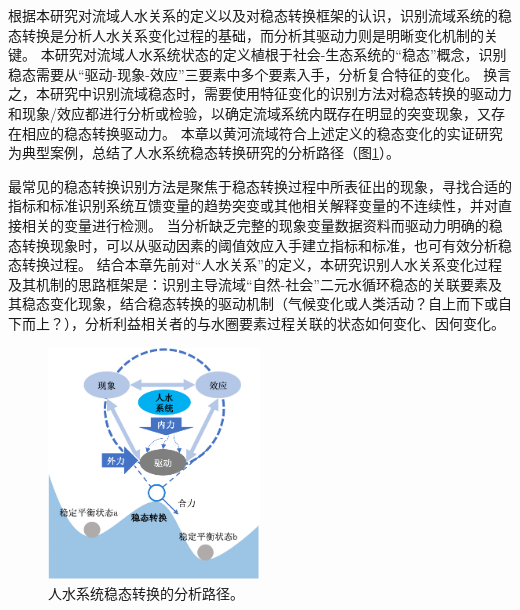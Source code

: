 根据本研究对流域人水关系的定义以及对稳态转换框架的认识，识别流域系统的稳态转换是分析人水关系变化过程的基础，而分析其驱动力则是明晰变化机制的关键。
本研究对流域人水系统状态的定义植根于社会-生态系统的“稳态”概念，识别稳态需要从“驱动-现象-效应”三要素中多个要素入手，分析复合特征的变化。
换言之，本研究中识别流域稳态时，需要使用特征变化的识别方法对稳态转换的驱动力和现象/效应都进行分析或检验，以确定流域系统内既存在明显的突变现象，又存在相应的稳态转换驱动力。
本章以黄河流域符合上述定义的稳态变化的实证研究为典型案例，总结了人水系统稳态转换研究的分析路径（图\ref{ch2:fig:identifying}）。

最常见的稳态转换识别方法是聚焦于稳态转换过程中所表征出的现象，寻找合适的指标和标准识别系统互馈变量的趋势突变或其他相关解释变量的不连续性，并对直接相关的变量进行检测。
当分析缺乏完整的现象变量数据资料而驱动力明确的稳态转换现象时，可以从驱动因素的阈值效应入手建立指标和标准，也可有效分析稳态转换过程。
结合本章先前对“人水关系”的定义，本研究识别人水关系变化过程及其机制的思路框架是：识别主导流域“自然-社会”二元水循环稳态的关联要素及其稳态变化现象，结合稳态转换的驱动机制（气候变化或人类活动？自上而下或自下而上？），分析利益相关者的与水圈要素过程关联的状态如何变化、因何变化。

\begin{figure}[!htb] %
    \centering
    \includegraphics[width=0.5\textwidth]{img/ch2/ch2_framework.png}
    \caption[人水系统稳态转换的分析路径]{人水系统稳态转换的分析路径。}\label{ch2:fig:identifying}
\end{figure}
